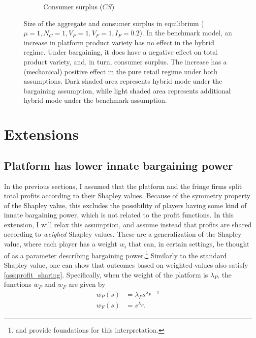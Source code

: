 \documentclass[a4paper]{article}
\begin{document}
\begin{figure}
\begin{subfigure}[b]{0.45\textwidth}
        \caption{Consumer surplus ($CS$)}
        \label{fig:welfare_consumer_surplus}
    \end{subfigure}
    \caption{Size of the aggregate and consumer surplus in equilibrium ($\mu = 1, N_C = 1, V_P = 1, V_F = 1, I_F = 0.2$). In the benchmark model, an increase in platform product variety has no effect in the hybrid regime. Under bargaining, it does have a negative effect on total product variety, and, in turn, consumer surplus. The increase has a (mechanical) positive effect in the pure retail regime under both assumptions. Dark shaded area represents hybrid mode under the bargaining assumption, while light shaded area represents additional hybrid mode under the benchmark assumption.}
    \label{fig:welfare}
\end{figure}


\section{Extensions}
\label{sec:extensions}

\subsection{Platform has lower innate bargaining power}
\label{sec:lower_bargaining_power}

In the previous sections, I assumed that the platform and the fringe firms split total profits according to their Shapley values.
Because of the symmetry property of the Shapley value, this excludes the possibility of players having some kind of innate bargaining power, which is not related to the profit functions.
In this extension, I will relax this assumption, and assume instead that profits are shared according to \emph{weighed} Shapley values.
These are a generalization of the Shapley value, where each player has a weight $w_i$ that can, in certain settings, be thought of as a parameter describing bargaining power.\footnote{
    \textcite{hart1996bargaining} and \textcite{stole1996intra} provide foundations for this interpretation.
}
Similarly to the standard Shapley value, one can show that outcomes based on weighted values also satisfy \cref{ass:profit_sharing}.
Specifically, when the weight of the platform is $\lambda_P$, the functions $w_P$ and $w_F$ are given by
\begin{align*}
    w_P(s) &= \lambda_P s ^ {\lambda_P - 1} \\
    w_F(s) &= s ^ {\lambda_P}.
\end{align*}
\end{document}
